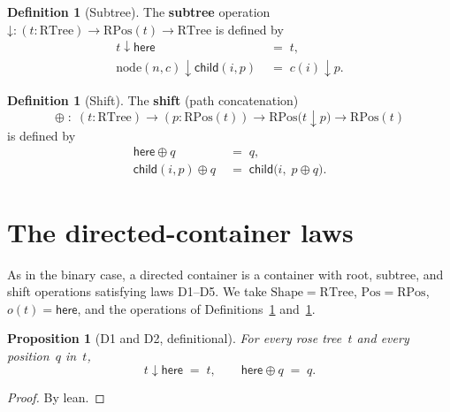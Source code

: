 \documentclass[11pt,a4paper]{article}
\theoremstyle{plain}
\newtheorem{proposition}[theorem]{Proposition}
\theoremstyle{definition}
\newtheorem{definition}[theorem]{Definition}
\newcommand{\RTree}{\mathrm{RTree}}
\newcommand{\RPos}{\mathrm{RPos}}
\begin{document}
\begin{definition}[Subtree]\label{def:sub}
The \textbf{subtree} operation
$\mathord{\downarrow} : (t : \RTree) \to \RPos(t) \to \RTree$
is defined by
\begin{align}
  t \mathbin{\downarrow} \mathsf{here}
  &\;=\; t, \\
  \mathrm{node}(n, c) \mathbin{\downarrow} \mathsf{child}(i, p)
  &\;=\; c(i) \mathbin{\downarrow} p.
\end{align}
\end{definition}

\begin{definition}[Shift]\label{def:shift}
The \textbf{shift} (path concatenation)
\begin{equation}
  \oplus \;:\;
  (t : \RTree) \to
  (p : \RPos(t)) \to
  \RPos\bigl(t \mathbin{\downarrow} p\bigr) \to
  \RPos(t)
\end{equation}
is defined by
\begin{align}
  \mathsf{here} \oplus q
  &\;=\; q, \\
  \mathsf{child}(i, p) \oplus q
  &\;=\; \mathsf{child}\bigl(i,\; p \oplus q\bigr).
\end{align}
\end{definition}

\section{The directed-container laws}

As in the binary case, a directed container is a container with root,
subtree, and shift operations satisfying laws D1--D5. We take
$\mathrm{Shape} = \RTree$, $\mathrm{Pos} = \RPos$,
$o(t) = \mathsf{here}$, and the operations of
Definitions~\ref{def:sub} and~\ref{def:shift}.

\begin{proposition}[D1 and D2, definitional]\label{prop:d1-d2}
For every rose tree~$t$ and every position~$q$ in~$t$,
\begin{equation}
  t \mathbin{\downarrow} \mathsf{here} \;=\; t,
  \qquad
  \mathsf{here} \oplus q \;=\; q.
\end{equation}
\end{proposition}

\begin{proof}
By lean.
\end{proof}
\end{document}
